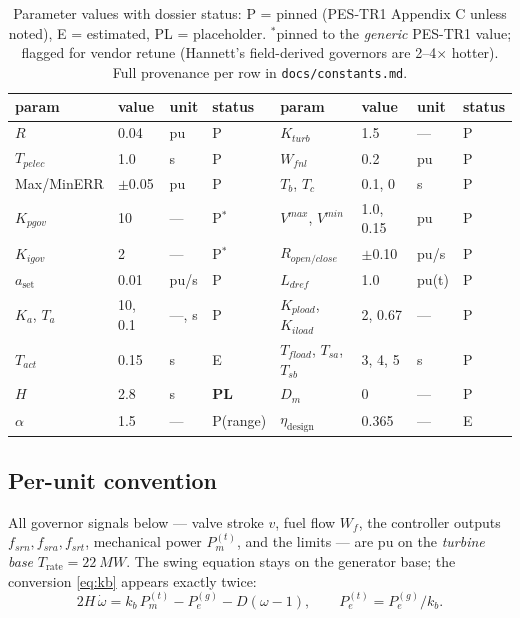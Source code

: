 \documentclass[11pt]{article}
\begin{document}
\begin{table}[h]\centering
\small
\begin{tabular}{llll@{\qquad}llll}
\toprule
param & value & unit & status & param & value & unit & status \\
\midrule
$R$ & 0.04 & pu & P & $K_{turb}$ & 1.5 & --- & P \\
$T_{pelec}$ & 1.0 & s & P & $W_{fnl}$ & 0.2 & pu & P \\
Max/MinERR & $\pm$0.05 & pu & P & $T_b$, $T_c$ & 0.1, 0 & s & P \\
$K_{pgov}$ & 10 & --- & P$^{*}$ & $V^{max}$, $V^{min}$ & 1.0, 0.15 & pu & P \\
$K_{igov}$ & 2 & --- & P$^{*}$ & $R_{open/close}$ & $\pm$0.10 & pu/s & P \\
$a_\text{set}$ & 0.01 & pu/s & P & $L_{dref}$ & 1.0 & pu(t) & P \\
$K_a$, $T_a$ & 10, 0.1 & ---, s & P & $K_{pload}$, $K_{iload}$ & 2, 0.67 & --- & P \\
$T_{act}$ & 0.15 & s & E & $T_{fload}$, $T_{sa}$, $T_{sb}$ & 3, 4, 5 & s & P \\
$H$ & 2.8 & s & \textbf{PL} & $D_m$ & 0 & --- & P \\
$\alpha$ & 1.5 & --- & P(range) & $\eta_\text{design}$ & 0.365 & --- & E \\
\bottomrule
\end{tabular}
\caption{Parameter values with dossier status: P = pinned (PES-TR1
Appendix C unless noted), E = estimated, PL = placeholder.
$^{*}$pinned to the \emph{generic} PES-TR1 value; flagged for vendor
retune (Hannett's field-derived governors are 2--4$\times$ hotter).
Full provenance per row in \texttt{docs/constants.md}.}
\end{table}

\subsection{Per-unit convention}
All governor signals below --- valve stroke $v$, fuel flow $W_f$, the
controller outputs $f_{srn}, f_{sra}, f_{srt}$, mechanical power
$P_m^{(t)}$, and the limits --- are pu on the \emph{turbine base}
$T_\text{rate} = \SI{22}{MW}$. The swing equation stays on the generator
base; the conversion \eqref{eq:kb} appears exactly twice:
\begin{equation}
  2H\,\dot\omega = k_b\,P_m^{(t)} - P_e^{(g)} - D(\omega-1),
  \qquad
  P_e^{(t)} = P_e^{(g)}/k_b .
\end{equation}
\end{document}

